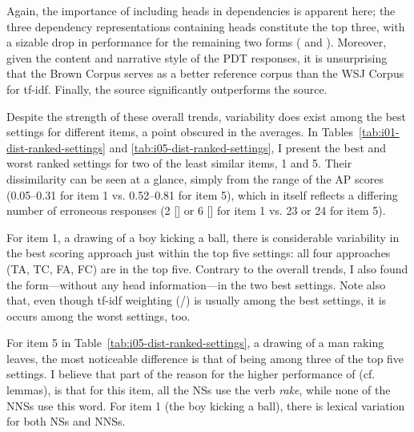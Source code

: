 Again, the importance of including heads in dependencies is apparent here; the three dependency representations containing heads constitute the top three, with a sizable drop in performance for the remaining two forms ( and ). Moreover, given the content and narrative style of the PDT responses, it is unsurprising that the Brown Corpus serves as a better reference corpus than the WSJ Corpus for tf-idf. Finally, the  source significantly outperforms the  source.

Despite the strength of these overall trends, variability
does exist among the best settings for different items, a point obscured
in the averages.  In Tables~\ref{tab:i01-dist-ranked-settings} and
\ref{tab:i05-dist-ranked-settings}, I present the best and worst
ranked settings for two of the least similar items, 1 and 5.
Their dissimilarity can be seen at a glance, simply from the range of
the AP scores (0.05--0.31 for item 1 vs. 0.52--0.81 for item 5), which
in itself reflects a differing number of erroneous responses (2 []
or 6 [] for item 1 vs. 23 or 24 for item 5).

For item 1, a drawing of a boy kicking a ball, there is considerable
variability in the best scoring approach just within the top five settings:
all four approaches (TA, TC, FA, FC) are in the top five.  Contrary to the overall
trends, I also found the  form---without any head
information---in the two best settings.  Note also that, even though
tf-idf weighting (/) is usually among the best settings, it is
occurs among the worst settings, too.

For item 5 in Table~\ref{tab:i05-dist-ranked-settings}, a drawing of a
man raking leaves, the most noticeable difference is that
of  being among three of the top five settings.
I believe that part of the reason for
the higher performance of  (cf. lemmas), is that for this
item, all the NSs use the verb \textit{rake}, while none of the NNSs use this word.  For item 1 (the boy kicking a ball), there is lexical variation
for both NSs and NNSs.

